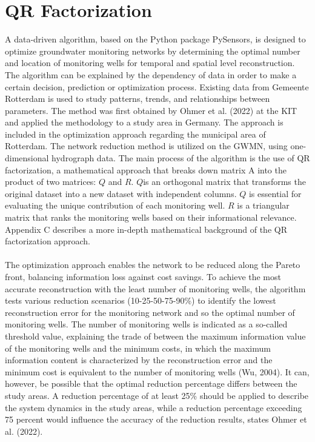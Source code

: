 \section{QR Factorization}
A data-driven algorithm, based on the Python package PySensors, is designed to optimize groundwater monitoring networks by determining the optimal number and location of monitoring wells for temporal and spatial level reconstruction. The algorithm can be explained by the dependency of data in order to make a certain decision, prediction or optimization process. Existing data from Gemeente Rotterdam is used to study patterns, trends, and relationships between parameters. The method was first obtained by Ohmer et al. (2022) at the KIT and applied the methodology to a study area in Germany. The approach is included in the optimization approach regarding the municipal area of Rotterdam. The network reduction method is utilized on the GWMN, using one-dimensional hydrograph data. The main process of the algorithm is the use of QR factorization, a mathematical approach that breaks down matrix A into the product of two matrices: \(Q\) and \(R\). \(Q\)is an orthogonal matrix that transforms the original dataset into a new dataset with independent columns. \(Q\) is essential for evaluating the unique contribution of each monitoring well. \(R\) is a triangular matrix that ranks the monitoring wells based on their informational relevance. Appendix C describes a more in-depth mathematical background of the QR factorization approach. \\
\\
The optimization approach enables the network to be reduced along the Pareto front, balancing information loss against cost savings. To achieve the most accurate reconstruction with the least number of monitoring wells, the algorithm tests various reduction scenarios (10-25-50-75-90\%) to identify the lowest reconstruction error for the monitoring network  and so the optimal number of monitoring wells. The number of monitoring wells is indicated as a so-called threshold value, explaining the trade of between the maximum information value of the monitoring wells and the minimum costs, in which the maximum information content is characterized by the reconstruction error and the minimum cost is equivalent to the number of monitoring wells (Wu, 2004). It can, however, be possible that the optimal reduction percentage differs between the study areas. A reduction percentage of at least 25\% should be applied to describe the system dynamics in the study areas, while a reduction percentage exceeding 75 percent would influence the accuracy of the reduction results, states Ohmer et al. (2022). 


